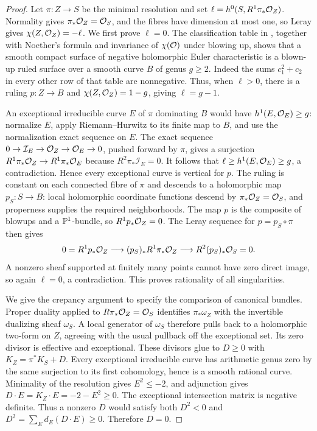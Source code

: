 \begin{proof}
Let $\pi:Z\to S$ be the minimal resolution and set $\ell=h^0(S,R^1\pi_*\mathcal O_Z)$. Normality gives $\pi_*\mathcal O_Z=\mathcal O_S$, and the fibres have dimension at most one, so Leray gives $\chi(Z,\mathcal O_Z)=-\ell$. We first prove $\ell=0$. The classification table in \cite[Theorem~2.2]{Peters2021}, together with Noether's formula and invariance of $\chi(\mathcal O)$ under blowing up, shows that a smooth compact surface of negative holomorphic Euler characteristic is a blown-up ruled surface over a smooth curve $B$ of genus $g\ge2$. Indeed the sums $c_1^2+c_2$ in every other row of that table are nonnegative. Thus, when $\ell>0$, there is a ruling $p:Z\to B$ and $\chi(Z,\mathcal O_Z)=1-g$, giving $\ell=g-1$.

An exceptional irreducible curve $E$ of $\pi$ dominating $B$ would have $h^1(E,\mathcal O_E)\ge g$: normalize $E$, apply Riemann--Hurwitz to its finite map to $B$, and use the normalization exact sequence on $E$. The exact sequence $0\to\mathcal I_E\to\mathcal O_Z\to\mathcal O_E\to0$, pushed forward by $\pi$, gives a surjection $R^1\pi_*\mathcal O_Z\to R^1\pi_*\mathcal O_E$ because $R^2\pi_*\mathcal I_E=0$. It follows that $\ell\ge h^1(E,\mathcal O_E)\ge g$, a contradiction. Hence every exceptional curve is vertical for $p$. The ruling is constant on each connected fibre of $\pi$ and descends to a holomorphic map $p_S:S\to B$: local holomorphic coordinate functions descend by $\pi_*\mathcal O_Z=\mathcal O_S$, and properness supplies the required neighborhoods. The map $p$ is the composite of blowups and a $\mathbb P^1$-bundle, so $R^1p_*\mathcal O_Z=0$. The Leray sequence for $p=p_S\circ\pi$ then gives
\[
0=R^1p_*\mathcal O_Z\longrightarrow (p_S)_*R^1\pi_*\mathcal O_Z
 \longrightarrow R^2(p_S)_*\mathcal O_S=0.
\]
A nonzero sheaf supported at finitely many points cannot have zero direct image, so again $\ell=0$, a contradiction. This proves rationality of all singularities.

We give the crepancy argument to specify the comparison of canonical bundles. Proper duality applied to $R\pi_*\mathcal O_Z=\mathcal O_S$ identifies $\pi_*\omega_Z$ with the invertible dualizing sheaf $\omega_S$. A local generator of $\omega_S$ therefore pulls back to a holomorphic two-form on $Z$, agreeing with the usual pullback off the exceptional set. Its zero divisor is effective and exceptional. These divisors glue to $D\ge0$ with $K_Z=\pi^*K_S+D$. Every exceptional irreducible curve has arithmetic genus zero by the same surjection to its first cohomology, hence is a smooth rational curve. Minimality of the resolution gives $E^2\le-2$, and adjunction gives $D\cdot E=K_Z\cdot E=-2-E^2\ge0$. The exceptional intersection matrix is negative definite. Thus a nonzero $D$ would satisfy both $D^2<0$ and $D^2=\sum_E d_E(D\cdot E)\ge0$. Therefore $D=0$.


\end{proof}
